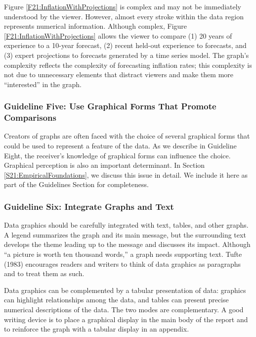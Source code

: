 Figure \ref{F21:InflationWithProjections} is complex and may not be
immediately understood by the viewer. However, almost every stroke
within the data region represents numerical information. Although
complex, Figure \ref{F21:InflationWithProjections} allows the viewer
to compare (1) 20 years of experience to a 10-year forecast, (2)
recent held-out experience to forecasts, and (3) expert projections
to forecasts generated by a time series model. The graph's
complexity reflects the complexity of forecasting inflation rates;
this complexity is not due to unnecessary elements that distract
viewers and make them more ``interested'' in the graph.

\linejed

\subsubsection*{Guideline Five: Use Graphical Forms That Promote Comparisons}

Creators of graphs are often faced with the choice of several
graphical forms that could be used to represent a feature of the
data. As we describe in Guideline Eight, the receiver's knowledge of
graphical forms can influence the choice. Graphical perception is
also an important determinant. In Section
\ref{S21:EmpiricalFoundations}, we discuss this issue in detail. We
include it here as part of the Guidelines Section for completeness.

\subsubsection*{Guideline Six: Integrate Graphs and Text}


Data graphics should be carefully integrated with text, tables, and
other graphs. A legend summarizes the graph and its main message,
but the surrounding text develops the theme leading up to the
message and discusses its impact. Although ``a picture is worth ten
thousand words,'' a graph needs supporting text. Tufte (1983)
encourages readers and writers to think of data graphics as
paragraphs and to treat them as such.

Data graphics can be complemented by a tabular presentation of data:
graphics can highlight relationships among the data, and tables can
present precise numerical descriptions of the data. The two modes
are complementary. A good writing device is to place a graphical
display in the main body of the report and to reinforce the graph
with a tabular display in an appendix.

